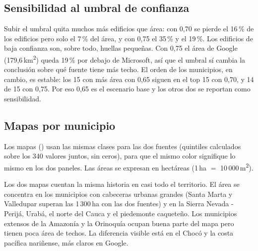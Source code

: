 \subsection{Sensibilidad al umbral de confianza}
\label{sec:sensibilidad}



Subir el umbral quita muchos más edificios que área: con 0,70 se pierde el
16\,\% de los edificios pero solo el 7\,\% del área, y con 0,75 el 35\,\% y el
19\,\%. Los edificios de baja confianza son, sobre todo, huellas pequeñas. Con
0,75 el área de Google (179,6\,km\textsuperscript{2}) queda 19\,\% por debajo de
Microsoft, así que el umbral sí cambia la conclusión sobre qué fuente tiene más
techo. El orden de los municipios, en cambio, es estable: los 15 con más área
con 0,65 siguen en el top 15 con 0,70, y 14 de 15 con 0,75. Por eso 0,65 es el
escenario base y los otros dos se reportan como sensibilidad.

\subsection{Mapas por municipio}
\label{sec:mapas}

Los mapas () usan las mismas clases para las dos fuentes
(quintiles calculados sobre los 340 valores juntos, sin ceros), para que el
mismo color signifique lo mismo en los dos paneles. Las áreas se expresan en
hectáreas (1\,ha $=$ 10\,000\,m\textsuperscript{2}).


Los dos mapas cuentan la misma historia en casi todo el territorio. El área se
concentra en los municipios con cabeceras urbanas grandes (Santa Marta y
Valledupar superan las 1\,300\,ha con las dos fuentes) y en la Sierra Nevada -
Perijá, Urabá, el norte del Cauca y el piedemonte caqueteño. Los municipios
extensos de la Amazonía y la Orinoquía ocupan buena parte del mapa pero tienen
poca área de techos. La diferencia visible está en el Chocó y la costa
pacífica nariñense, más claros en Google.


